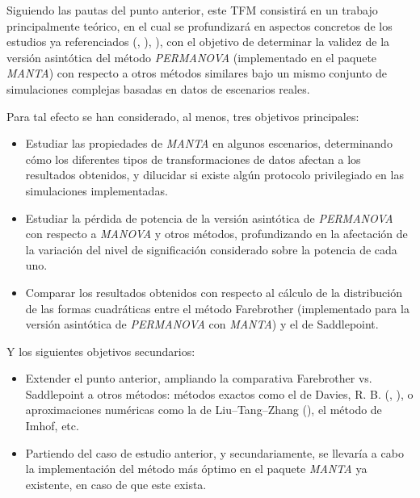 \documentclass[IB,BIB]{TFUOC}%
\begin{document}
Siguiendo las pautas del punto anterior, este TFM consistirá en un trabajo principalmente teórico, en el cual se profundizará en aspectos concretos de los estudios ya referenciados (\cite{garrido-martin_fast_2022}, \cite{garrido-martin_identification_2021}), \cite{monlong_identification_2014}), con el objetivo de determinar la validez de la versión asintótica del método \textit{PERMANOVA} (implementado en el paquete \textit{MANTA}) con respecto a otros métodos similares bajo un mismo conjunto de simulaciones complejas basadas en datos de escenarios reales.



Para tal efecto se han considerado, al menos, tres objetivos principales:

{\small
\begin{itemize}
    \item Estudiar las propiedades de \textit{MANTA} en algunos escenarios, determinando cómo los diferentes tipos de transformaciones de datos afectan a los resultados obtenidos, y dilucidar si existe algún protocolo privilegiado en las simulaciones implementadas.
    \item Estudiar la pérdida de potencia de la versión asintótica de \textit{PERMANOVA} con respecto a \textit{MANOVA} y otros métodos, profundizando en la afectación de la variación del nivel de significación considerado sobre la potencia de cada uno.
    \item Comparar los resultados obtenidos con respecto al cálculo de la distribución de las formas cuadráticas entre el método Farebrother (implementado para la versión asintótica de \textit{PERMANOVA} con \textit{MANTA}) y el de Saddlepoint.
\end{itemize}}

Y los siguientes objetivos secundarios:

{\small
\begin{itemize}
    \item Extender el punto anterior, ampliando la comparativa Farebrother vs. Saddlepoint a otros métodos: métodos exactos como el de Davies, R. B. (\cite{davies_numerical_1973}, \cite{davies_algorithm_1980}), o aproximaciones numéricas como la de Liu–Tang–Zhang (\cite{qi_genetic_2022}), el método de Imhof, etc.
    \item Partiendo del caso de estudio anterior, y secundariamente, se llevaría a cabo la implementación del método más óptimo en el paquete \textit{MANTA} ya existente, en caso de que este exista.
\end{itemize}}
\end{document}
